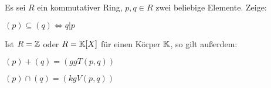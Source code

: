 \begin{sheet}
\begin{problem}[title={Ideale vs. Teilbarkeit}]
        Es sei $R$ ein kommutativer Ring, $p,q\in R$ zwei beliebige Elemente. Zeige:
        \begin{subproblem}
            $(p) \subseteq (q) \iff q | p$
        \end{subproblem}

        Ist $R=\mathbb{Z}$ oder $R=\mathbb{K}[X]$ für einen Körper $\mathbb{K}$, so gilt außerdem:
        \begin{subproblem}
            $(p) + (q) = (ggT(p,q))$
        \end{subproblem}
        \begin{subproblem}
            $(p) \cap (q) = (kgV(p,q))$
        \end{subproblem}
    \end{problem}
\end{sheet}